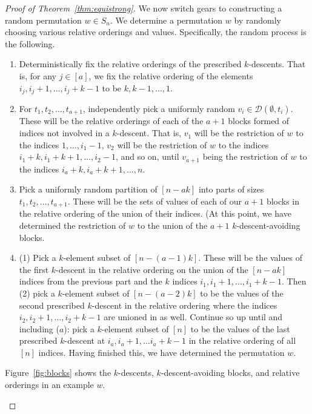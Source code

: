 \documentclass{amsart}
\theoremstyle{definition}
\begin{document}
\begin{proof}[Proof of Theorem~\ref{thm:equistrong}]
We now switch gears to constructing a random permutation $w\in S_n$. We determine a permutation $w$ by randomly choosing various relative orderings and values. Specifically, the random process is the following.
\begin{enumerate}[label=\arabic*.]
    \item Deterministically fix the relative orderings of the prescribed $k$-descents. That is, for any $j\in [a]$, we fix the relative ordering of the elements $i_j,i_j+1,\ldots,i_j+k-1$ to be $k,k-1,\ldots,1$.
    \item For $t_1,t_2,\ldots,t_{a+1}$, independently pick a uniformly random $v_i\in \mathcal{D}(\emptyset,t_i)$. These will be the relative orderings of each of the $a+1$ blocks formed of indices not involved in a $k$-descent. That is, $v_1$ will be the restriction of $w$ to the indices $1,\ldots, i_1-1$, $v_2$ will be the restriction of $w$ to the indices $i_1+k, i_1+k+1,\ldots,i_2-1$, and so on, until $v_{a+1}$ being the restriction of $w$ to the indices $i_a+k, i_{a}+k+1,\ldots, n$.
    \item Pick a uniformly random partition of $[n-a k]$ into parts of sizes $t_1,t_2,\ldots, t_{a+1}$. These will be the sets of values of each of our $a+1$ blocks in the relative ordering of the union of their indices. (At this point, we have determined the restriction of $w$ to the union of the $a+1$ $k$-descent-avoiding blocks.
    \item (1) Pick a $k$-element subset of $[n-(a-1)k]$. These will be the values of the first $k$-descent in the relative ordering on the union of the $[n-a k]$ indices from the previous part and the $k$ indices $i_1,i_1+1,\ldots,i_1+k-1$. Then (2) pick a $k$-element subset of $[n-(a-2)k]$ to be the values of the second prescribed $k$-descent in the relative ordering where the indices $i_2,i_2+1,\ldots,i_2+k-1$ are unioned in as well. Continue so up until and including ($a$): pick a $k$-element subset of $[n]$ to be the values of the last prescribed $k$-descent at $i_a, i_a+1,\ldots i_a+k-1$ in the relative ordering of all $[n]$ indices. Having finished this, we have determined the permutation $w$.  
\end{enumerate}
Figure~\ref{fig:blocks} shows the $k$-descents, $k$-descent-avoiding blocks, and relative orderings in an example $w$.
\begin{figure}
    \centering
\end{figure}
\end{proof}
\end{document}
